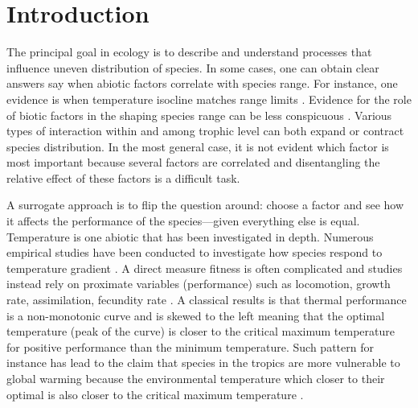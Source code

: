 \section*{Introduction}
The principal goal in ecology is to describe and understand processes that influence uneven distribution of species.
In some cases, one can obtain clear answers say when abiotic factors correlate with species range.
For instance, one evidence is when temperature isocline matches  range limits \citep{Root1988}.
Evidence for the role of biotic factors in the shaping species range can be less conspicuous \citep{Krebs2000}.
Various types of interaction within and among trophic level can both expand or contract species distribution.
In the most general case, it is not evident which factor is most important because several factors are correlated and disentangling the relative effect of these factors is a difficult task.


A surrogate approach is to flip the question around: choose a factor and see how it affects the performance of the species---given everything else is equal.
Temperature is one abiotic that has been investigated in depth.
Numerous empirical studies have been conducted to investigate how species respond to temperature gradient \citep[e.g.,][]{Angilletta2009}.
A direct measure fitness is often complicated and studies instead rely on proximate variables (performance) such as locomotion, growth rate, assimilation, fecundity rate \citep[][and reference therein]{Angilletta2009}.
A classical results is that thermal performance is a non-monotonic curve and is skewed to the left meaning that the optimal temperature (peak of the curve) is closer to the critical maximum temperature for positive performance than the minimum temperature. 
Such pattern for instance has lead to the claim that species in the tropics are more vulnerable to global warming because the environmental temperature which closer to their optimal  is also  closer to the critical maximum temperature \citep{Deutsch2008}.

